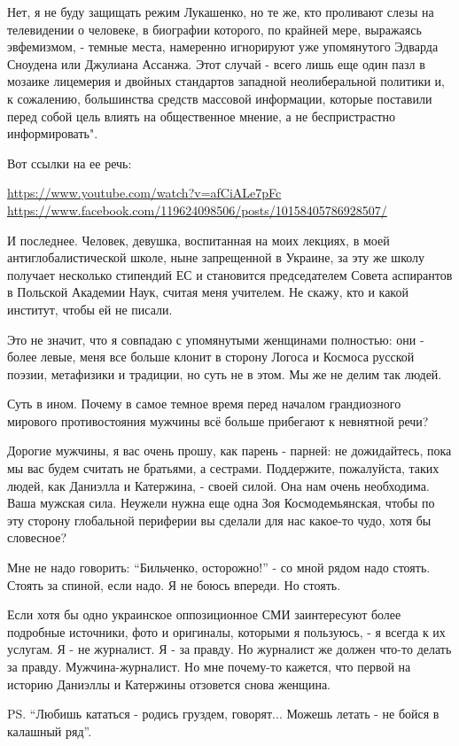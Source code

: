 Нет, я не буду защищать режим Лукашенко, но те же, кто проливают слезы на
телевидении о человеке, в биографии которого, по крайней мере, выражаясь
эвфемизмом, - темные места, намеренно игнорируют уже упомянутого Эдварда
Сноудена или Джулиана Ассанжа. Этот случай - всего лишь еще один пазл в мозаике
лицемерия и двойных стандартов западной неолиберальной политики и, к сожалению,
большинства средств массовой информации, которые поставили перед собой цель
влиять на общественное мнение, а не беспристрастно информировать".

Вот ссылки на ее речь:  

\url{https://www.youtube.com/watch?v=afCiALe7pFc} 
\url{https://www.facebook.com/119624098506/posts/10158405786928507/}

И последнее. Человек, девушка, воспитанная на моих лекциях, в моей
антиглобалистической школе, ныне запрещенной в Украине, за эту же школу
получает несколько стипендий ЕС и становится председателем Совета аспирантов в
Польской Академии Наук, считая меня учителем. Не скажу, кто и какой институт,
чтобы ей не писали.  

Это не значит, что я совпадаю с упомянутыми женщинами полностью: они - более
левые, меня все больше клонит в сторону Логоса и Космоса русской поэзии,
метафизики и традиции, но суть не в этом. Мы же не делим так людей.

Суть в ином. Почему в самое темное время перед началом грандиозного мирового
противостояния мужчины всё больше прибегают к невнятной речи? 

Дорогие мужчины, я вас очень прошу, как парень - парней: не дожидайтесь, пока
мы вас будем считать не братьями, а сестрами. Поддержите, пожалуйста, таких
людей, как Даниэлла и Катержина, - своей силой. Она нам очень необходима. Ваша
мужская сила. Неужели нужна еще одна Зоя Космодемьянская, чтобы по эту сторону
глобальной периферии вы сделали для нас какое-то чудо, хотя бы словесное? 

Мне не надо говорить: \enquote{Бильченко, осторожно!} - со мной рядом надо стоять.
Стоять за спиной, если надо. Я не боюсь впереди. Но стоять. 

Если хотя бы одно украинское оппозиционное СМИ заинтересуют более подробные
источники, фото и оригиналы, которыми я пользуюсь, - я всегда к их услугам. Я -
не журналист. Я - за правду. Но журналист же должен что-то делать за правду.
Мужчина-журналист. Но мне почему-то кажется, что первой на историю Даниэллы и
Катержины отзовется снова женщина.

PS. \enquote{Любишь кататься - родись груздем, говорят...
Можешь летать - не бойся в калашный ряд}.

